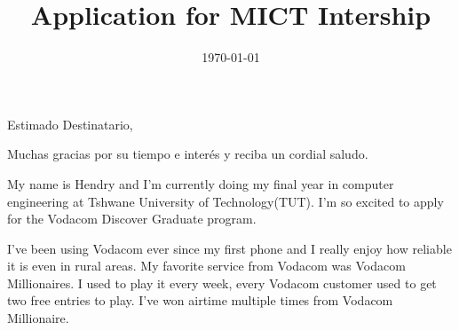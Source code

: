 \documentclass[11pt,a4paper,roman]{moderncv}        %
\title{Application for MICT Intership}                               %
\begin{document}
\date{\today}
\opening{Estimado Destinatario,}
\closing{Muchas gracias por su tiempo e interés y reciba un cordial saludo.}

\makelettertitle

My name is Hendry and I'm currently doing my final year in computer engineering
at Tshwane University of Technology(TUT). I'm so excited to apply for the
Vodacom Discover Graduate program.


I've been using Vodacom ever since my first phone and I really enjoy how
reliable it is even in rural areas. My favorite service from Vodacom was
Vodacom Millionaires. I used to play it every week,  every Vodacom customer
used to get two free entries to play.  I've won airtime multiple times from
Vodacom Millionaire.
\end{document}
